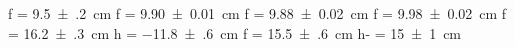 f = \SI{+9.5(2)}{\centi\meter}
f = \SI{+9.90(1)}{\centi\meter}
f = \SI{+9.88(2)}{\centi\meter}
f = \SI{+9.98(2)}{\centi\meter}
f = \SI{+16.2(3)}{\centi\meter}
h = \SI{-11.8(6)}{\centi\meter}
f = \SI{+15.5(6)}{\centi\meter}
h- = \SI{+15(1)}{\centi\meter}
